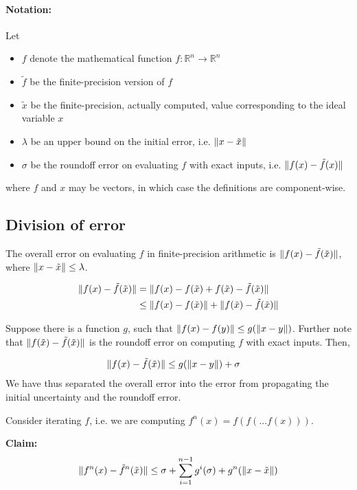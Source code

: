 \paragraph{Notation:} Let
\begin{itemize}
\item $f$ denote the mathematical function $f: \mathbb{R}^n \to \mathbb{R}^n$
\item $\tilde{f}$ be the finite-precision version of $f$
\item $\tilde{x}$ be the finite-precision, actually computed, value corresponding to the
ideal variable $x$
\item $\lambda$ be an upper bound on the initial error, i.e. $\lVert x - \tilde{x} \rVert$
\item $\sigma$ be the roundoff error on evaluating $f$ with exact inputs, i.e.
  $\lVert f(x) - \tilde{f}(x) \rVert$
\end{itemize}
where $f$ and $x$ may be vectors, in which case the definitions are component-wise.

\subsection{Division of error}
The overall error on evaluating $f$ in finite-precision arithmetic is
  $\lVert f(x) - \tilde{f}(\tilde{x}) \rVert$, where $\lVert x - \tilde{x} \rVert \le \lambda$.

\begin{align}
\lVert f(x) - \tilde{f}(\tilde{x}) \rVert &=
 \lVert f(x) - f(\tilde{x}) + f(\tilde{x}) - \tilde{f}(\tilde{x}) \rVert \\
 &\le \lVert f(x) - f(\tilde{x}) \rVert + \lVert f(\tilde{x}) - \tilde{f}(\tilde{x}) \rVert
\end{align}

Suppose there is a function $g$, such that $\lVert f(x) - f(y) \rVert \le g(\lVert x - y \rVert)$.
Further note that $\lVert f(\tilde{x}) - \tilde{f}(\tilde{x}) \rVert$ is the roundoff error on
computing $f$ with exact inputs. Then,

\begin{align}
\label{errorLoopBody}
\lVert f(x) - \tilde{f}(\tilde{x}) \rVert &\le g(\lVert x - y \rVert) + \sigma
\end{align}
We have thus separated the overall error into the error from propagating
the initial uncertainty and the roundoff error.

Consider iterating $f$, i.e. we are computing $f^n(x) = f(f(...f(x)))$.

{\bf Claim: }
\begin{equation}
\lVert f^n(x) - \tilde{f}^n(\tilde{x})\rVert \le \sigma + \sum^{n - 1}_{i = 1} g^i(\sigma) + g^n(\lVert x - \tilde{x} \rVert)
\end{equation}

